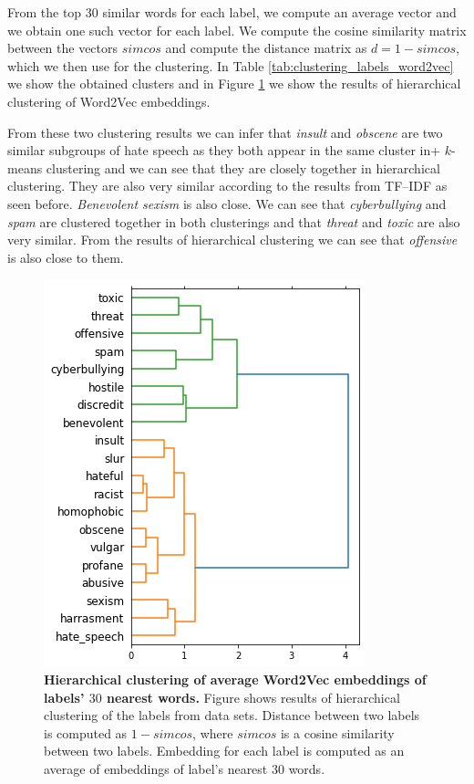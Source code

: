 \documentclass[fleqn,moreauthors,10pt]{ds_report}
\begin{document}
From the top 30 similar words for each label, we compute an average vector and we obtain one such vector for each label. We compute the cosine similarity matrix between the vectors $simcos$ and compute the distance matrix as $d = 1 - simcos$, which we then use for the clustering. In Table \ref{tab:clustering_labels_word2vec} we show the obtained clusters and in Figure \ref{fig:hier} we show the results of hierarchical clustering of Word2Vec embeddings.

From these two clustering results we can infer that \textit{insult} and \textit{obscene} are two similar subgroups of hate speech as they both appear in the same cluster in+ $k$-means clustering and we can see that they are closely together in hierarchical clustering. They are also very similar according to the results from TF--IDF as seen before. \textit{Benevolent sexism} is also close. We can see that \textit{cyberbullying} and \textit{spam} are clustered together in both clusterings and that \textit{threat} and \textit{toxic} are also very similar. From the results of hierarchical clustering we can see that \textit{offensive} is also close to them.

\begin{figure}[htb]\centering
	\includegraphics[width=0.6\linewidth]{hier.png}
	\caption{\textbf{Hierarchical clustering of average Word2Vec embeddings of labels' $30$ nearest words.} Figure shows results of hierarchical clustering of the labels from data sets. Distance between two labels is computed as $1 - simcos$, where $simcos$ is a cosine similarity between two labels. Embedding for each label is computed as an average of embeddings of label's nearest $30$ words.}
	\label{fig:hier}
\end{figure}
\end{document}
